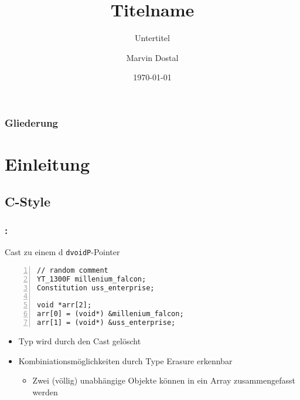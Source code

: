 \documentclass{beamer}
\title{Titelname}
\subtitle{Untertitel}
\author{Marvin Dostal}
\institute{{\bf Betreuer:} Betreuer Name}
\date{\today}
\begin{document}
\frame{\titlepage}

\begin{frame}
    \frametitle{Gliederung}
    \tableofcontents[hideallsubsections]
    \clearpage

\end{frame}

\section{Einleitung}
\subsection{C-Style}

\begin{frame}[fragile] %
    \frametitle{\secname: \subsecname}

    \pdfpcnote{}

    \begin{block}{Cast zu einem d \texttt{dvoidP}-Pointer}
        \begin{lstlisting}[style=cpp, numbers=left]
// random comment
YT_1300F millenium_falcon;
Constitution uss_enterprise;

void *arr[2];
arr[0] = (void*) &millenium_falcon;
arr[1] = (void*) &uss_enterprise;
        \end{lstlisting}

        \begin{itemize}
            \item Typ wird durch den Cast gelöscht
                \pause
            \item Kombiniationsmöglichkeiten durch Type Erasure erkennbar
                \begin{itemize}
                    \item Zwei (völlig) unabhängige Objekte können in ein Array 
                        zusammengefasst werden
                \end{itemize}
        \end{itemize}
    \end{block}

\end{frame} 
\end{document}
